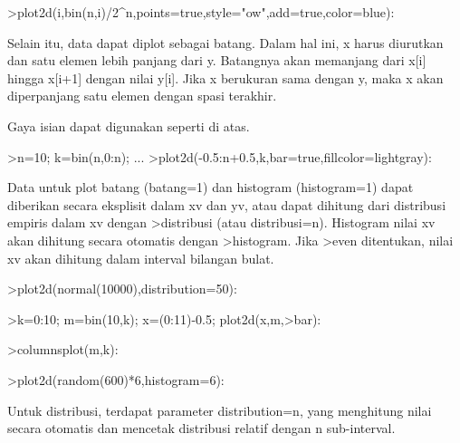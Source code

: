 \documentclass{article}
\begin{document}
\begin{eulernotebook}
\begin{eulercomment}
\begin{eulercomment}
\begin{eulercomment}
\begin{eulercomment}
\begin{eulercomment}
\begin{eulercomment}
\begin{eulercomment}
\begin{eulercomment}
\begin{eulerprompt}
>plot2d(i,bin(n,i)/2^n,points=true,style="ow",add=true,color=blue):
\end{eulerprompt}
\begin{eulercomment}
Selain itu, data dapat diplot sebagai batang. Dalam hal ini, x harus
diurutkan dan satu elemen lebih panjang dari y. Batangnya akan
memanjang dari x[i] hingga x[i+1] dengan nilai y[i]. Jika x berukuran
sama dengan y, maka x akan diperpanjang satu elemen dengan spasi
terakhir.

Gaya isian dapat digunakan seperti di atas.
\end{eulercomment}
\begin{eulerprompt}
>n=10; k=bin(n,0:n); ...
>plot2d(-0.5:n+0.5,k,bar=true,fillcolor=lightgray):
\end{eulerprompt}
\begin{eulercomment}
Data untuk plot batang (batang=1) dan histogram (histogram=1) dapat
diberikan secara eksplisit dalam xv dan yv, atau dapat dihitung dari
distribusi empiris dalam xv dengan \textgreater{}distribusi (atau distribusi=n).
Histogram nilai xv akan dihitung secara otomatis dengan \textgreater{}histogram.
Jika \textgreater{}even ditentukan, nilai xv akan dihitung dalam interval bilangan
bulat.
\end{eulercomment}
\begin{eulerprompt}
>plot2d(normal(10000),distribution=50):
\end{eulerprompt}
\begin{eulerprompt}
>k=0:10; m=bin(10,k); x=(0:11)-0.5; plot2d(x,m,>bar):
\end{eulerprompt}
\begin{eulerprompt}
>columnsplot(m,k):
\end{eulerprompt}
\begin{eulerprompt}
>plot2d(random(600)*6,histogram=6):
\end{eulerprompt}
\begin{eulercomment}
Untuk distribusi, terdapat parameter distribution=n, yang menghitung
nilai secara otomatis dan mencetak distribusi relatif dengan n
sub-interval.
\end{eulercomment}

\end{eulercomment}
\end{eulercomment}
\end{eulercomment}
\end{eulercomment}
\end{eulercomment}
\end{eulercomment}
\end{eulercomment}
\end{eulercomment}
\end{eulernotebook}
\end{document}

